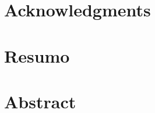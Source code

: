 \documentclass[12pt,a4paper,twoside]{book} %
\begin{document}
	
	\thispagestyle{empty}
	
	
	\newpage
	
	\newpage
	\thispagestyle{plain}
	\mbox{}
	
	
	
	\newpage
	\thispagestyle{plain}
	\mbox{}
	
	\newpage
	\thispagestyle{empty}
	

	\cleardoublepage
	
	\chapter*{Acknowledgments}
	
	
	\newpage
	\thispagestyle{plain}
	\mbox{}
	
	
	\chapter*{Resumo}
	
	
	\newpage
	\thispagestyle{plain}
	\mbox{}
	
	\chapter*{Abstract}
	
	
	\newpage
	\thispagestyle{plain}
	\mbox{}
		
	
	\tableofcontents{}
	
	
	\listoffigures
    \newpage
    \thispagestyle{plain}
    \mbox{}	
	\listoftables
	\newpage
	\thispagestyle{plain}
	\mbox{}
    
    \renewcommand\lstlistingname{Code Sample}

\end{document}
